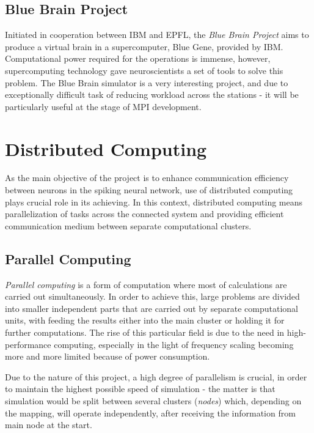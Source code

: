 \documentclass[12pt]{report}
\begin{document}
\subsection{Blue Brain Project}

Initiated in cooperation between IBM and EPFL, the \emph{Blue Brain Project} aims to produce a virtual brain in a supercomputer, Blue Gene, provided by IBM.\cite{BlueBrain} Computational power
required for the operations is immense, however, supercomputing technology gave neuroscientists a set of tools to solve this problem. The Blue Brain simulator is
a very interesting project, and due to exceptionally difficult task of reducing workload across the stations - it will be particularly useful at the stage of MPI development.

\section{Distributed Computing}

As the main objective of the project is to enhance communication efficiency between neurons in the spiking neural network, use of distributed computing plays crucial
role in its achieving. In this context, distributed computing means parallelization of tasks across the connected system and providing efficient communication medium
between separate computational clusters.

\subsection{Parallel Computing}

\emph{Parallel computing} is a form of computation where most of calculations are carried out simultaneously.\cite{G.S.Almasi1989} In order to achieve this, large problems
are divided into smaller independent parts that are carried out by separate computational units, with feeding the results either into the main cluster or holding it for further
computations. The rise of this particular field is due to the need in high-performance computing, especially in the light of frequency scaling becoming more and more
limited because of power consumption.\cite{Kumar2002}

Due to the nature of this project, a high degree of parallelism is crucial, in order to maintain the highest possible speed of simulation - the matter is that simulation would
be split between several clusters (\emph{nodes}) which, depending on the mapping, will operate independently, after receiving the information from main node at the start.
\end{document}
